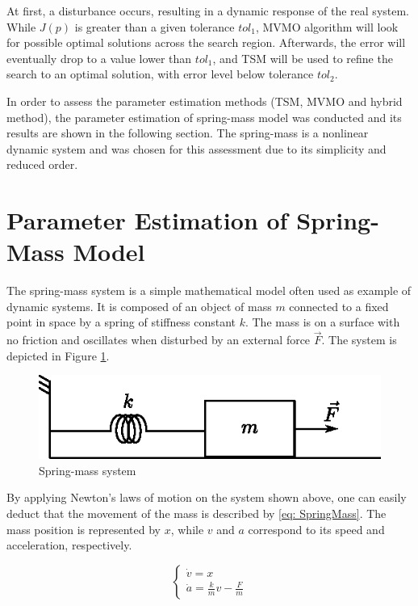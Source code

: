 At first, a disturbance occurs, resulting in a dynamic response of the real system. While $J(p)$ is greater than a given tolerance $tol_{1}$, MVMO algorithm will look for possible optimal solutions across the search region. Afterwards, the error will eventually drop to a value lower than $tol_{1}$, and TSM will be used to refine the search to an optimal solution, with error level below tolerance $tol_{2}$.

In order to assess the parameter estimation methods (TSM, MVMO and hybrid method), the parameter estimation of spring-mass model was conducted and its results are shown in the following section. The spring-mass is a nonlinear dynamic system and was chosen for this assessment due to its simplicity and reduced order.

\section{Parameter Estimation of Spring-Mass Model}

The spring-mass system is a simple mathematical model often used as example of dynamic systems. It is composed of an object of mass $m$ connected to a fixed point in space by a spring of stiffness constant $k$. The mass is on a surface with no friction and oscillates when disturbed by an external force $\vec{F}$. The system is depicted in Figure \ref{fig: spring_mass}.

\begin{figure}[h]
	\caption{Spring-mass system}
	\begin{center}
		\includegraphics[scale=1]{Images/spring_mass.eps}
	\end{center}
	\label{fig: spring_mass}
\end{figure}

By applying Newton's laws of motion on the system shown above, one can easily deduct that the movement of the mass is described by \eqref{eq: SpringMass}. The mass position is represented by $x$, while $v$ and $a$ correspond to its speed and acceleration, respectively.

\begin{equation}
	\begin{cases}
		\dot{v} = x \\
		\dot{a} = \frac{k}{m}v - \frac{F}{m}
	\end{cases}
	\label{eq: SpringMass}
\end{equation}

